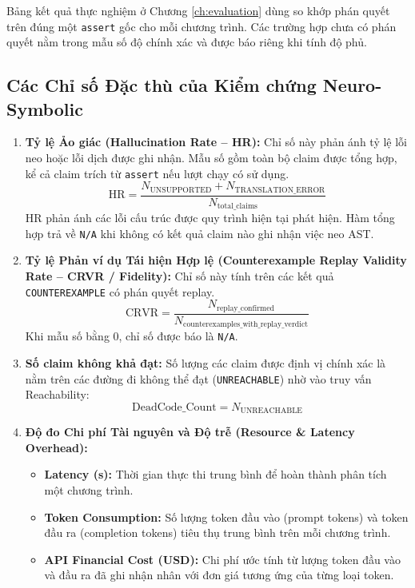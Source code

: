 Bảng kết quả thực nghiệm ở Chương \ref{ch:evaluation} dùng so khớp phán quyết trên đúng một \texttt{assert} gốc cho mỗi chương trình. Các trường hợp chưa có phán quyết nằm trong mẫu số độ chính xác và được báo riêng khi tính độ phủ.

\subsection{Các Chỉ số Đặc thù của Kiểm chứng Neuro-Symbolic}

\begin{enumerate}
    \item \textbf{Tỷ lệ Ảo giác (Hallucination Rate -- HR):}
    Chỉ số này phản ánh tỷ lệ lỗi neo hoặc lỗi dịch được ghi nhận. Mẫu số gồm toàn bộ claim được tổng hợp, kể cả claim trích từ \texttt{assert} nếu lượt chạy có sử dụng.
    \begin{equation}
    \text{HR} = \frac{N_{\text{UNSUPPORTED}} + N_{\text{TRANSLATION\_ERROR}}}{N_{\text{total\_claims}}}
    \end{equation}
    HR phản ánh các lỗi cấu trúc được quy trình hiện tại phát hiện. Hàm tổng hợp trả về \texttt{N/A} khi không có kết quả claim nào ghi nhận việc neo AST.

    \item \textbf{Tỷ lệ Phản ví dụ Tái hiện Hợp lệ (Counterexample Replay Validity Rate -- CRVR / Fidelity):}
    Chỉ số này tính trên các kết quả \texttt{COUNTEREXAMPLE} có phán quyết replay.
    \begin{equation}
    \text{CRVR} = \frac{N_{\text{replay\_confirmed}}}{N_{\text{counterexamples\_with\_replay\_verdict}}}
    \end{equation}
    Khi mẫu số bằng 0, chỉ số được báo là \texttt{N/A}.

    \item \textbf{Số claim không khả đạt:}
    Số lượng các claim được định vị chính xác là nằm trên các đường đi không thể đạt (\texttt{UNREACHABLE}) nhờ vào truy vấn Reachability:
    \begin{equation}
    \text{DeadCode\_Count} = N_{\text{UNREACHABLE}}
    \end{equation}

    \item \textbf{Độ đo Chi phí Tài nguyên và Độ trễ (Resource \& Latency Overhead):}
    \begin{itemize}
        \item \textbf{Latency (s):} Thời gian thực thi trung bình để hoàn thành phân tích một chương trình.
        \item \textbf{Token Consumption:} Số lượng token đầu vào (prompt tokens) và token đầu ra (completion tokens) tiêu thụ trung bình trên mỗi chương trình.
        \item \textbf{API Financial Cost (USD):} Chi phí ước tính từ lượng token đầu vào và đầu ra đã ghi nhận nhân với đơn giá tương ứng của từng loại token.
    \end{itemize}
\end{enumerate}
